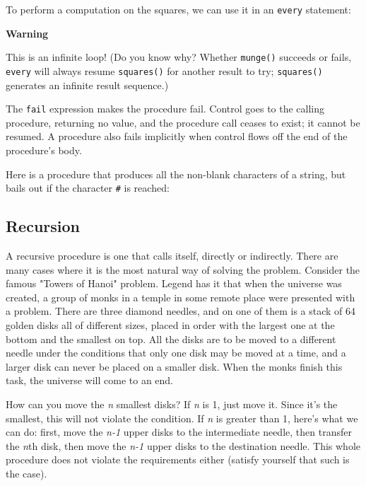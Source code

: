 To perform a computation on the squares, we can use it in an
\texttt{every} statement:


{\sffamily\bfseries
Warning}

{\sffamily
This is an infinite loop! (Do you know why? Whether \texttt{munge()} succeeds or
fails, \texttt{every} will always resume \texttt{squares()} for another result
to try; \texttt{squares()} generates an infinite result sequence.)}

The \texttt{fail} expression makes the
procedure fail. Control goes to the calling procedure, returning
no value, and the procedure call ceases to exist; it cannot be
resumed. A procedure also fails implicitly when control flows off the
end of the procedure's body.

Here is a procedure that produces all the non-blank characters of a
string, but bails out if the character \texttt{\#} is reached:


\subsection*{Recursion}

A recursive procedure is one that calls itself,
directly or indirectly. There are many cases where it is the most
natural way of solving the problem. Consider the famous
"Towers of Hanoi" problem.
Legend has it that when the universe was created, a group of monks
in a temple in some remote place were presented with a problem.
There are three diamond needles, and on one of them is a
stack of 64 golden disks all of different sizes, placed in
order with the largest one at the bottom and the smallest on top. All
the disks are to be moved to a different needle under the conditions
that only one disk may be moved at a time, and a larger disk can never
be placed on a smaller disk. When the monks finish this task, the
universe will come to an end.

How can you move the \textit{n} smallest disks? If \textit{n} is
1, just move it. Since it's the
smallest, this will not violate the condition. If \textit{n} is
greater than 1, here's what we can do: first, move the
\textit{n-1} upper disks to the intermediate needle, then transfer the
\textit{n}th disk, then move the \textit{n-1} upper disks to the
destination needle. This whole procedure does not violate the
requirements either (satisfy yourself that such is the case).


